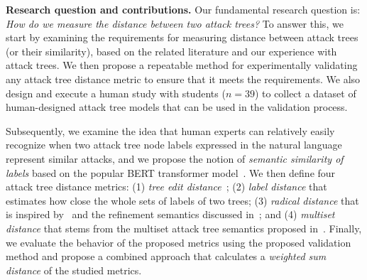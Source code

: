 



\textbf{Research question and contributions.} 
Our fundamental research question is: \emph{How do we measure the distance between two attack trees?} 
To answer this, we start by examining the requirements for measuring distance between attack trees (or their similarity), based on the related literature and our experience with attack trees. We then propose a repeatable method for experimentally validating any attack tree distance metric to ensure that it meets the requirements. We also design and execute a human study with students ($n=39$) to collect a dataset of human-designed attack tree models that can be used in the validation process.

Subsequently, we examine the idea that human experts can relatively easily recognize when two attack tree node labels expressed in the natural language represent similar attacks, and we propose the notion of \emph{semantic similarity of labels} based on the popular BERT transformer model~\cite{devlin2018bert}. We then define four attack tree distance metrics: (1) \emph{tree edit distance}~\cite{zhang_editing_1992}; (2) \emph{label distance} that estimates how close the whole sets of labels of two trees; (3) \emph{radical distance} that is inspired by~\cite{schiele2021novel} and the refinement semantics discussed in~\cite{gadyatskayaRefinementAwareGenerationAttack2017}; and (4) \emph{multiset distance} that stems from the multiset attack tree semantics proposed in~\cite{mauwFoundationsAttackTrees2006}. Finally, we evaluate the behavior of the proposed metrics using the proposed validation method and propose a combined approach that calculates a \emph{weighted sum distance} of the studied metrics.

